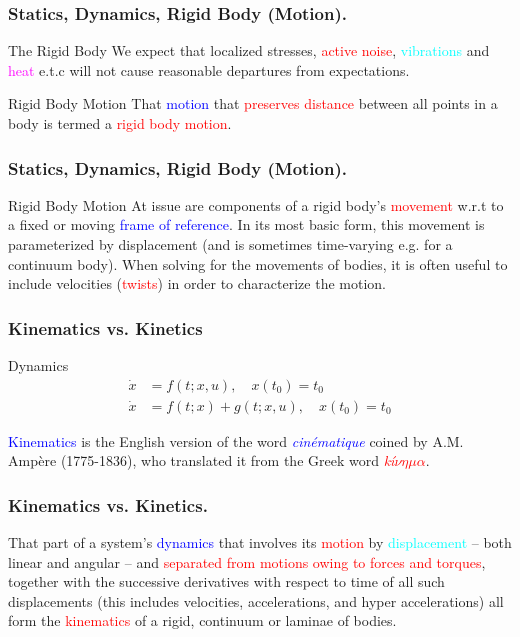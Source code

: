 \begin{frame}
	\frametitle{Statics, Dynamics, Rigid Body (Motion).}
	\begin{block}{The Rigid Body}
		We expect that \textcolor{light-blue}{localized stresses}, \textcolor{red}{active noise},  \textcolor{cyan}{vibrations} and \textcolor{magenta}{heat} e.t.c will not cause \textcolor{light-red}{reasonable departures} from expectations.
	\end{block}
	\begin{block}{Rigid Body Motion}
		That \textcolor{blue}{motion} that \textcolor{red}{preserves distance} between all points in a body is termed a \textcolor{red}{rigid body motion}.
	\end{block}
\end{frame}

\begin{frame}
	\frametitle{Statics, Dynamics, Rigid Body (Motion).}
	\begin{block}{Rigid Body Motion}
		At issue are components of a rigid body's \textcolor{red}{movement} w.r.t to a fixed or moving \textcolor{blue}{frame of reference}. In its most basic form, this movement is parameterized by displacement (and is sometimes time-varying e.g. for a continuum body). When solving for the movements of bodies, it is often useful to include velocities (\textcolor{red}{twists}) in order to characterize the motion.
	\end{block}
\end{frame}


\begin{frame}
	\frametitle{Kinematics vs. Kinetics}
	\begin{block}{Dynamics}
		\begin{align}
			\dot{x} &= f(t; x, u),  \quad x(t_0) = t_0 \\
			\dot{x} &= f(t; x)  + g(t; x, u),  \quad x(t_0) = t_0 
		\end{align}
	\end{block}
	\begin{definition}[Kinematics.] \textcolor{blue}{{Kinematics}} is the English version of the word  \textcolor{blue}{\textit{cin{\'e}matique}} coined by A.M. Amp{\`e}re (1775-1836), who translated it from the Greek word \textcolor{red}{\textit{k{\'i}$\nu \eta \mu \alpha$}}.
	\end{definition}
\end{frame}

\begin{frame}
	\frametitle{Kinematics vs. Kinetics.}
	\begin{definition}[Truesdell]
		That part of a system's \textcolor{blue}{dynamics} that involves its \textcolor{red}{motion} by \textcolor{cyan}{displacement} -- both linear and angular -- and \textcolor{red}{separated from motions owing to forces and  torques}, together with the successive derivatives with respect to time of all such displacements (this includes velocities, accelerations, and hyper accelerations) all form the \textcolor{red}{kinematics} of a \textcolor{light-blue}{{rigid}}, \textcolor{light-blue}{{continuum}} or \textcolor{light-blue}{{laminae}} of bodies.
	\end{definition}
\end{frame}


